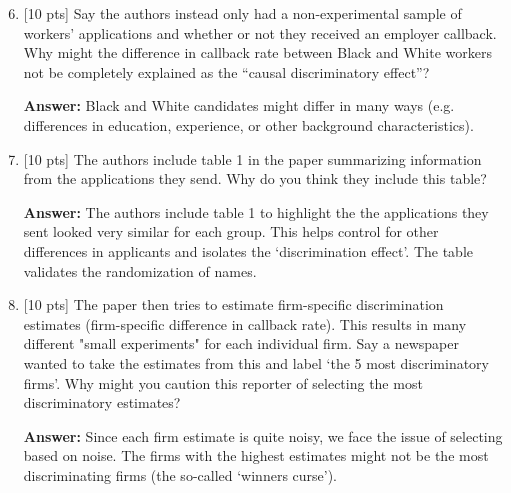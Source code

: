 \documentclass[12pt]{article}
\newcommand{\answer}[1]{{\color{blue_winged_teal}\textbf{Answer:} #1}}
\newcommand{\pts}[1]{{\color{zinc500} [#1 pts]}}
\begin{document}
\bigskip
\begin{enumerate}
    \setcounter{enumi}{5}
  \item \pts{10} Say the authors instead only had a non-experimental sample of
    workers' applications and whether or not they received an employer callback.
    Why might the difference in callback rate between Black and White
    workers not be completely explained as the ``causal discriminatory effect''?

    \answer{
      Black and White candidates might differ in many ways (e.g. differences in education, experience, or other background characteristics).
    }

  \item \pts{10} The authors include table 1 in the paper summarizing
    information from the applications they send.
    Why do you think they include this table?

  \answer{
    The authors include table 1 to highlight the the applications they sent looked very similar for each group. 
    This helps control for other differences in applicants and isolates the `discrimination effect'. 
    The table validates the randomization of names.
  }

  \item \pts{10} The paper then tries to estimate firm-specific discrimination
    estimates (firm-specific difference in callback rate).
    This results in many different "small experiments" for each individual firm.
    Say a newspaper wanted to take the estimates from this and label
    `the 5 most discriminatory firms'.
    Why might you caution this reporter of selecting the most
    discriminatory estimates?

  \answer{
    Since each firm estimate is quite noisy, we face the issue of selecting based on noise.
    The firms with the highest estimates might not be the most discriminating firms (the so-called `winners curse').
  }
\end{enumerate}
\end{document}
